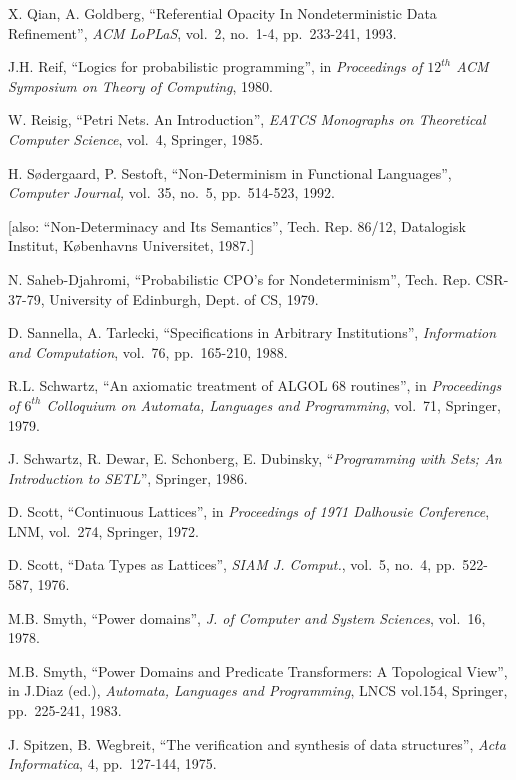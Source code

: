  X. Qian, A. Goldberg, ``Referential Opacity In 
Nondeterministic Data Refinement'', {\em ACM LoPLaS}, vol.~2, no.~1-4, 
 pp.~233-241, 1993.

 J.H. Reif, ``Logics for probabilistic programming'', 
in {\em Proceedings of $12^{th}$ ACM Symposium on Theory of Computing}, 1980.

 W. Reisig, ``Petri Nets.  An Introduction'', {\em 
EATCS Monographs on Theoretical Computer Science}, vol.~4, Springer, 1985.

 H. S{\o}dergaard, P. Sestoft, ``Non-Determinism in Functional
Languages'', {\em Computer Journal,} vol.~35, no.~5,  pp.~514-523, 1992.

{\small{[also: ``Non-Determinacy and 
Its Semantics'', Tech.  Rep.  86/12, Datalogisk Institut, K{\o}benhavns 
Universitet, 1987.]}\normalsize}

 N. Saheb-Djahromi, ``Probabilistic CPO's for 
Nondeterminism'', Tech.  Rep.  CSR-37-79, University of Edinburgh, Dept.  
of CS, 1979.

 D. Sannella, A. Tarlecki, ``Specifications in 
Arbitrary Institutions'', {\em Information and Computation}, vol.~76, 
pp.~165-210, 1988.

 R.L. Schwartz, ``An axiomatic treatment of ALGOL 68 
routines'', in {\em Proceedings of $6^{th}$ Colloquium on Automata, Languages 
and Programming}, vol.~71, Springer, 1979.

 J. Schwartz, R. Dewar, E. Schonberg, E. Dubinsky, 
``{\em Programming with Sets; An Introduction to SETL}'', Springer, 1986.

 D. Scott, ``Continuous Lattices'', in {\em Proceedings 
of 1971 Dalhousie Conference}, LNM, vol.~274, Springer, 1972.

 D. Scott, ``Data Types as Lattices'', {\em SIAM J. 
Comput.}, vol.~5, no.~4, pp.~522-587, 1976.

 M.B. Smyth, ``Power domains'', {\em J. of Computer and 
System Sciences}, vol.~16, 1978.

 M.B. Smyth, ``Power Domains and Predicate 
Transformers: A Topological View'', in J.Diaz (ed.), {\em Automata,
Languages and Programming\/}, LNCS vol.154, Springer, pp.~225-241, 1983.

 J. Spitzen, B. Wegbreit, ``The verification and synthesis of
data structures'', {\em Acta Informatica}, 4, pp.~127-144, 1975.

